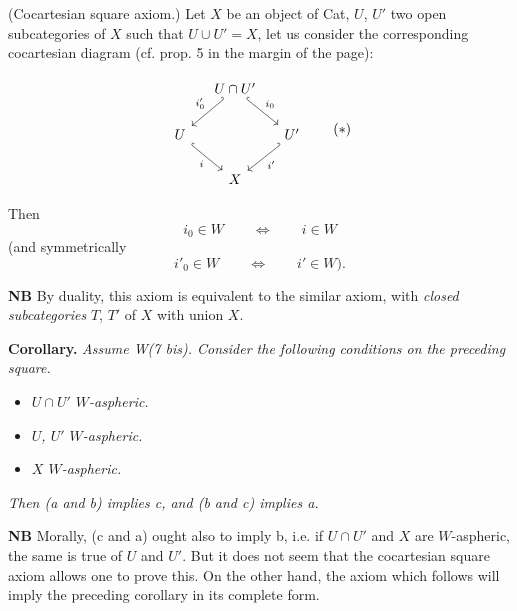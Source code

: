 \begin{description}[leftmargin=5em, style=nextline]
\item[W(7 bis)] (Cocartesian square axiom.) Let $X$ be an object of Cat, $U$, $U'$ two open subcategories of $X$ such that $U\cup U'=X$, let us consider the corresponding cocartesian diagram (cf. prop. 5 in the margin of the page):

\[
\begin{tikzcd}[column sep=small]
& U\cap U' \arrow[dl, hook', "i'_0"'] \arrow[dr, hook, "i_0"] & \\
U \arrow[dr, hook, "i"'] & & U' \arrow[dl, hook', "i'"] \\
& X &
\end{tikzcd}
\tag*{$(*)$}
\]

Then
\[
i_0\in W\qquad\Longleftrightarrow\qquad i\in W
\]
(and symmetrically
\[
i'_0\in W\qquad\Longleftrightarrow\qquad i'\in W).
\]
\end{description}

\textbf{NB} By duality, this axiom is equivalent to the similar axiom, with \textit{closed subcategories} $T$, $T'$ of $X$ with union $X$.

\textbf{Corollary.} \textit{Assume \textup{W(7 bis)}. Consider the following conditions on the preceding square.}

\begin{itemize}
\item[\textit{a)}] \textit{$U\cap U'$ $W$-aspheric.}
\item[\textit{b)}] \textit{$U$, $U'$ $W$-aspheric.}
\item[\textit{c)}] \textit{$X$ $W$-aspheric.}
\end{itemize}

\textit{Then (a and b) implies c, and (b and c) implies a.}

\textbf{NB} Morally, (c and a) ought also to imply b, i.e. if $U\cap U'$ and $X$ are $W$-aspheric, the same is true of $U$ and $U'$. But it does not seem that the cocartesian square axiom allows one to prove this. On the other hand, the axiom which follows will imply the preceding corollary in its complete form.


